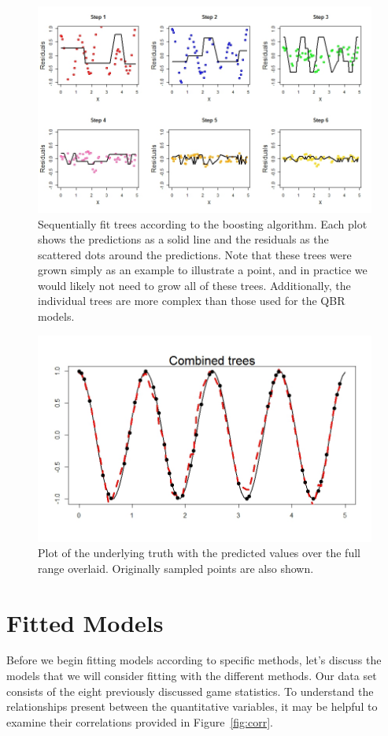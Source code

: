 \documentclass[12pt]{article}\usepackage[]{graphicx}\usepackage[]{color}
\begin{document}
\begin{figure}[h]
	\centering
	\includegraphics[width=.8\textwidth]{boostex.jpeg}
	\captionsetup{font=footnotesize,labelfont=footnotesize}
	\caption{\label{fig:boostex} Sequentially fit trees according to the boosting algorithm. Each plot shows the predictions as a solid line and the residuals as the scattered dots around the predictions. Note that these trees were grown simply as an example to illustrate a point, and in practice we would likely not need to grow all of these trees. Additionally, the individual trees are more complex than those used for the QBR models.}
\end{figure}

\begin{figure}[h]
	\centering
	\includegraphics[width=.8\textwidth]{combine.jpeg}
	\captionsetup{font=footnotesize,labelfont=footnotesize}
	\caption{\label{fig:combine} Plot of the underlying truth with the predicted values over the full range overlaid. Originally sampled points are also shown.}
\end{figure}

\newpage
\section{Fitted Models}
Before we begin fitting models according to specific methods, let's discuss the models that we will consider fitting with the different methods. Our data set consists of the eight previously discussed game statistics. To understand the relationships present between the quantitative variables, it may be helpful to examine their correlations provided in Figure~\ref{fig:corr}.
\end{document}
